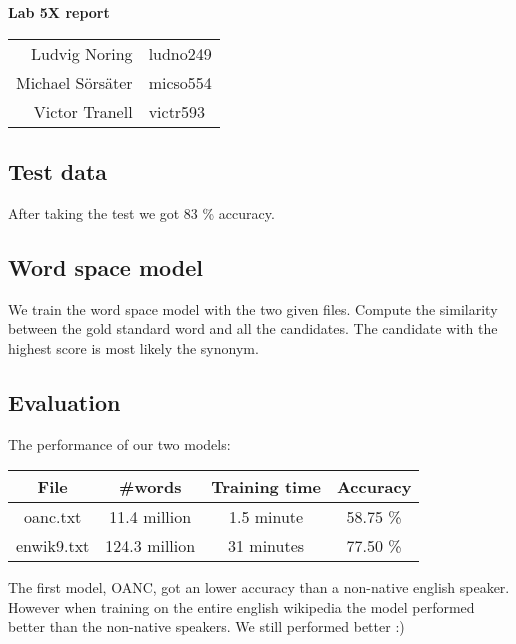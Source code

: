\documentclass[12pt,a4paper]{article}
\begin{document}
\begin{center}

	\vspace{0.7cm}
	\LARGE
	\textbf{Lab 5X report }

	\Large
	\begin{table}[h]
	\centering
		\begin{tabular}{ r l }
		Ludvig Noring & ludno249 \\ Michael Sörsäter & micso554 \\ Victor Tranell &  victr593 \\
		\end{tabular}
	\end{table}
\end{center}

\subsection*{Test data}
After taking the test we got 83 \% accuracy.
\subsection*{Word space model}
We train the word space model with the two given files.
Compute the similarity between the gold standard word and all the candidates.
The candidate with the highest score is most likely the synonym.

\subsection*{Evaluation}
The performance of our two models:

\begin{table}[H]
	\centering
	\begin{tabular}{c c c c}
		File & \#words & Training time & Accuracy \\ \hline
		oanc.txt & 11.4 million & 1.5 minute & 58.75 \% \\
		enwik9.txt & 124.3 million & 31 minutes & 77.50 \%\\
	\end{tabular}
\end{table}

The first model, OANC, got an lower accuracy than a non-native english speaker.
However when training on the entire english wikipedia the model performed better than the non-native speakers.
We still performed better :)
\end{document}
